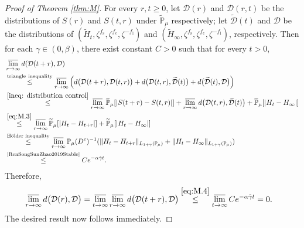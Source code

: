 \documentclass[12pt,a4paper]{amsart}
\theoremstyle{plain}
\theoremstyle{definition}
\numberwithin{equation}{section}
\begin{document}
\begin{proof}[Proof of Theorem \ref{thm:M}]
	For every $r,t\geq 0$, let $\mathcal D(r)$ and $\mathcal D(r,t)$ be the distributions of $S(r)$ and $S(t,r)$ under $\widetilde{\mathbb P}_{\mu}$ respectively;
	let $\widetilde{\mathcal D}(t)$ and $\mathcal D$ be the distributions of $(\widetilde H_t,\zeta^{f_\mathrm s},\zeta^{f_\mathrm c},\zeta^{-f_\mathrm l})$ and $(\widetilde H_\infty,\zeta^{f_\mathrm s},\zeta^{f_\mathrm c},\zeta^{-f_\mathrm l})$, respectively.
	Then for each $\gamma\in (0,\beta)$, there exist constant $C>0$ such that for every $t > 0$,
\begin{align}
 	&\varlimsup_{r\rightarrow \infty}d(\mathcal D(t+r),\mathcal D)
 	\\& \overset{\rm triangle~inequality}\leq \varlimsup_{r\rightarrow \infty}\Big( d\big(\mathcal D(t+r),\mathcal D(t,r)\big)+d\big(\mathcal D(t,r),\widetilde{\mathcal D}(t)\big)+d\big(\widetilde{\mathcal D}(t),\mathcal D\big)\Big)
 	\\&\overset{\eqref{ineq: distribution control}} \leq \varlimsup_{r\rightarrow \infty}\widetilde{\mathbb P}_{\mu}[|S(t+r) - S(t,r)|]+ \varlimsup_{r\rightarrow \infty} d\big(\mathcal D(t,r),\widetilde{\mathcal D}(t)\big) +\widetilde{\mathbb P}_{\mu}[|H_t-H_{\infty}|]
	\\&\overset{\eqref{eq:M.3}}\leq \varlimsup_{r\rightarrow \infty}\widetilde{\mathbb P}_{\mu}[|H_t - H_{t+r}|]+\widetilde{\mathbb P}_{\mu}[|H_t-H_{\infty}|]
  	\\&\overset{\text{H\"older inequality}}\leq \varlimsup_{r\rightarrow \infty}\mathbb P_{\mu}(D^c)^{-1}(\|H_t-H_{t+r}\|_{L_{1+\gamma} (\mathbb P_\mu)}+\|H_t-H_{\infty}\|_{L_{1+\gamma} (\mathbb P_\mu)})
	\\&\label{eq:M.4}\overset{\text{\cite[Lemma 3.3]{RenSongSunZhao2019Stable}}}\leq C e^{-\alpha \tilde \gamma t}.
\end{align}
	Therefore,
\begin{align}
 	&\varlimsup_{r\rightarrow \infty}d\big(\mathcal D(r),\mathcal D\big)
 	=\varlimsup_{t\to \infty}\varlimsup_{r\rightarrow \infty}d\big(\mathcal D(t+r),\mathcal D\big)
	\overset{\eqref{eq:M.4}}\leq \varlimsup_{t\rightarrow \infty}Ce^{-\alpha \tilde \gamma t} = 0.
\end{align}
	The desired result now follows immediately.


\end{proof}
\end{document}
